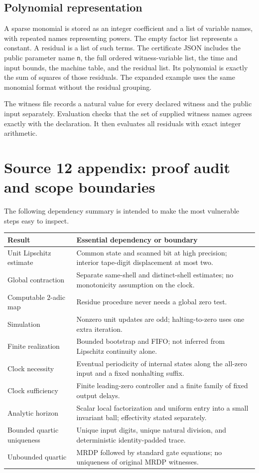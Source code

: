 \documentclass[11pt,letterpaper]{article}
\numberwithin{equation}{section}
\theoremstyle{definition}
\theoremstyle{remark}
\begin{document}
\subsection{Polynomial representation}
A sparse monomial is stored as an integer coefficient and a list of
variable names, with repeated names representing powers. The empty factor
list represents a constant. A residual is a list of such terms. The
certificate JSON includes the public parameter name \texttt{n}, the full
ordered witness-variable list, the time and input bounds, the machine
table, and the residual list. Its polynomial is exactly the sum of squares
of those residuals. The expanded example uses the same monomial format
without the residual grouping.

The witness file records a natural value for every declared witness and
the public input separately. Evaluation checks that the set of supplied
witness names agrees exactly with the declaration. It then evaluates all
residuals with exact integer arithmetic.

\section{Source 12 appendix: proof audit and scope boundaries}\label{pqc:ad:app:audit}
The following dependency summary is intended to make the most vulnerable
steps easy to inspect.
\begin{center}
\begin{tabularx}{\textwidth}{@{}p{}X@{}}
\toprule
Result & Essential dependency or boundary\\
\midrule
Unit Lipschitz estimate & Common state and scanned bit at high precision;
interior tape-digit displacement at most two.\\
Global contraction & Separate same-shell and distinct-shell estimates;
no monotonicity assumption on the clock.\\
Computable $2$-adic map & Residue procedure never needs a global zero test.\\
Simulation & Nonzero unit updates are odd; halting-to-zero uses one extra
iteration.\\
Finite realization & Bounded bootstrap and FIFO; not inferred from
Lipschitz continuity alone.\\
Clock necessity & Eventual periodicity of internal states along the all-zero
input and a fixed nonhalting suffix.\\
Clock sufficiency & Finite leading-zero controller and a finite family of
fixed output delays.\\
Analytic horizon & Scalar local factorization and uniform entry into a
small invariant ball; effectivity stated separately.\\
Bounded quartic uniqueness & Unique input digits, unique natural division,
and deterministic identity-padded trace.\\
Unbounded quartic & MRDP followed by standard gate equations; no uniqueness
of original MRDP witnesses.\\
\bottomrule
\end{tabularx}
\end{center}
\end{document}
